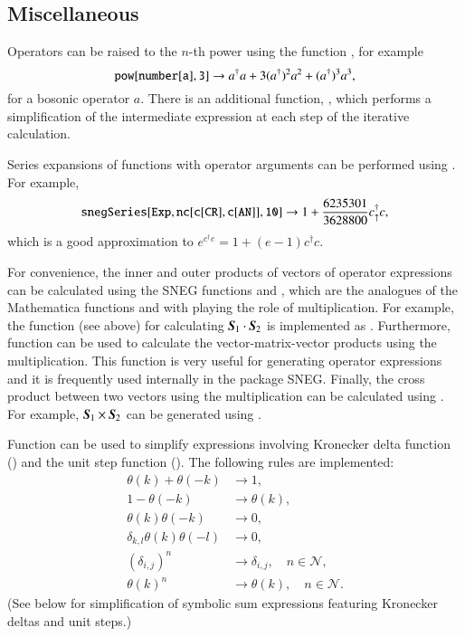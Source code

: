\documentclass[3p,number,preprint]{elsarticle}
\begin{document}
\subsection{Miscellaneous}

Operators can be raised to the $n$-th power using
the function , for example
%
\begin{equation}
{\tt pow[number[a],3]} \to a^\dag a + 3(a^\dag)^2 a^2
+ (a^\dag)^3 a^3,
\end{equation}
%
for a bosonic operator $a$. There is an additional function,
, which performs a simplification of the intermediate
expression at each step of the iterative calculation.

Series expansions of functions with operator arguments can be
performed using . For example,
%
\begin{equation}
{\tt snegSeries[Exp,nc[c[CR],c[AN]],10]}
\to 1 + \frac{6235301}{3628800} c^\dag_\uparrow c,
\end{equation}
%
which is a good approximation to $e^{c^\dag c} = 1+(e-1)c^\dag c$.

For convenience, the inner and outer products of vectors of operator
expressions can be calculated using the SNEG functions  and
, which are the analogues of the Mathematica functions
 and  with  playing the role of
multiplication. For example, the function  (see above)
for calculating $\boldsymbol{S}_1\cdot\boldsymbol{S}_2$ is implemented as
. Furthermore, function
 can be used to calculate the vector-matrix-vector products
using the  multiplication. This function is very useful for
generating operator expressions and it is frequently used internally
in the package SNEG. Finally, the cross product between two vectors
using the  multiplication can be calculated using
. For example, $\boldsymbol{S}_1 \times \boldsymbol{S}_2$ can be generated
using .

Function  can be used to simplify expressions
involving Kronecker delta function () and the unit
step function (). The following rules are implemented:
%
\begin{equation}
\begin{split}
\theta(k) + \theta(-k) &\to 1, \\
1-\theta(-k) &\to \theta(k), \\
\theta(k) \theta(-k) &\to 0, \\
\delta_{k,l} \theta(k) \theta(-l) &\to 0, \\
(\delta_{i,j})^n &\to \delta_{i,j}, \quad n \in \mathcal{N}, \\
\theta(k)^n &\to \theta(k), \quad n \in \mathcal{N}.
\end{split}
\end{equation}
%
(See below for simplification of symbolic sum expressions featuring
Kronecker deltas and unit steps.)
\end{document}
